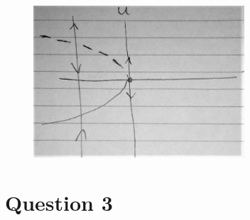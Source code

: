 \documentclass[12pt,a4paper]{article}
\begin{document}
\begin{figure}[H]
    \centering
    \includegraphics[width=0.7\textwidth]{q2-bifurcation}
\end{figure}

\section{Question 3}
\end{document}
